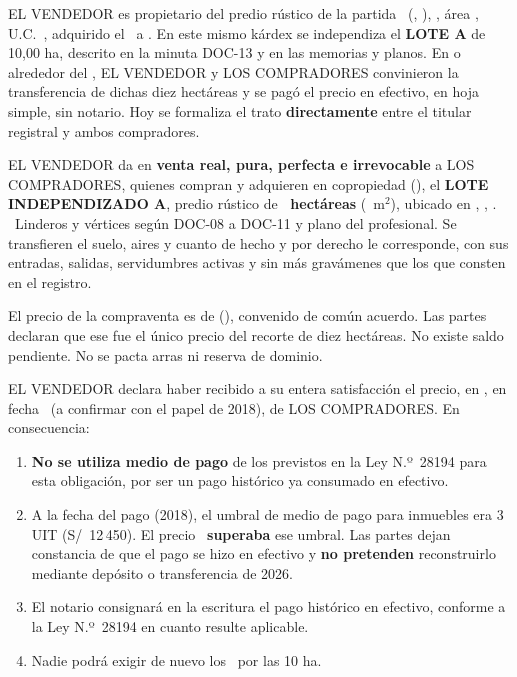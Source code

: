 \documentclass[12pt,a4paper]{article}
\begin{document}
EL VENDEDOR es propietario del predio rústico de la partida \PartidaMatriz\ (\OficinaRegistral, \ZonaRegistral), \UbicacionRegistral, área \AreaMatriz, U.C.\ \UnidadCatastral, adquirido el \FechaAdquisicionMatriz\ a \VendedoresAnteriores. En este mismo kárdex se independiza el \textbf{LOTE A} de 10,00 ha, descrito en la minuta DOC-13 y en las memorias y planos. En o alrededor del \FechaPago, EL VENDEDOR y LOS COMPRADORES convinieron la transferencia de dichas diez hectáreas y se pagó el precio en efectivo, en hoja simple, sin notario. Hoy se formaliza el trato \textbf{directamente} entre el titular registral y ambos compradores.

EL VENDEDOR da en \textbf{venta real, pura, perfecta e irrevocable} a LOS COMPRADORES, quienes compran y adquieren en copropiedad (\PorcentajeCopropiedad), el \textbf{LOTE INDEPENDIZADO A}, predio rústico de \textbf{\AreaIndependizarHa\ hectáreas} (\AreaIndependizarMetros\ m$^2$), ubicado en \Distrito, \Provincia, \Departamento. \CriterioRecorte\ Linderos y vértices según DOC-08 a DOC-11 y plano del profesional. Se transfieren el suelo, aires y cuanto de hecho y por derecho le corresponde, con sus entradas, salidas, servidumbres activas y sin más gravámenes que los que consten en el registro.

El precio de la compraventa es de \textbf{\MontoPago} (\textbf{\MontoPagoLetras}), convenido de común acuerdo. Las partes declaran que ese fue el único precio del recorte de diez hectáreas. No existe saldo pendiente. No se pacta arras ni reserva de dominio.

EL VENDEDOR declara haber recibido a su entera satisfacción el precio, en \textbf{\FormaPagoHistorica}, en fecha \FechaPago\ (a confirmar con el papel de 2018), de LOS COMPRADORES. En consecuencia:

\begin{enumerate}[leftmargin=1.15cm]
\item \textbf{No se utiliza medio de pago} de los previstos en la Ley N.º\ 28194 para esta obligación, por ser un pago histórico ya consumado en efectivo.
\item A la fecha del pago (2018), el umbral de medio de pago para inmuebles era 3 UIT (S/\ 12\,450). El precio \MontoPago\ \textbf{superaba} ese umbral. Las partes dejan constancia de que el pago se hizo en efectivo y \textbf{no pretenden} reconstruirlo mediante depósito o transferencia de 2026.
\item El notario consignará en la escritura el pago histórico en efectivo, conforme a la Ley N.º\ 28194 en cuanto resulte aplicable.
\item Nadie podrá exigir de nuevo los \MontoPago\ por las 10 ha.
\end{enumerate}
\end{document}
